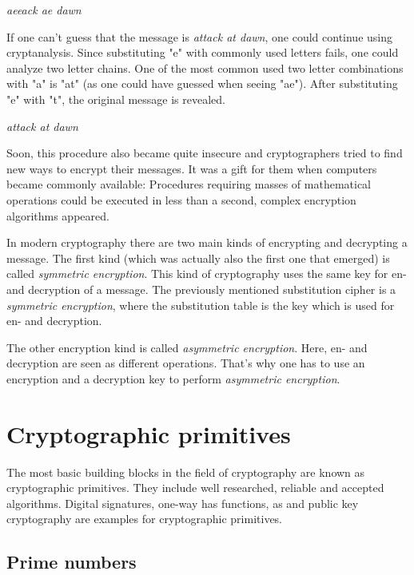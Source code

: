 \vspace{0.5cm}
\textit{aeeack ae dawn}
\vspace{0.5cm}

If one can't guess that the message is \textit{attack at dawn}, one could
continue using cryptanalysis. Since substituting "e" with commonly used letters
fails, one could analyze two letter chains. One of the most common used two
letter combinations with "a" is "at" (as one could have guessed when seeing
"ae").  After substituting "e" with "t", the original message is revealed.

\vspace{0.5cm}
\textit{attack at dawn}
\vspace{0.5cm}

Soon, this procedure also became quite insecure and cryptographers tried to
find new ways to encrypt their messages. It was a gift for them when computers
became commonly available: Procedures requiring masses of mathematical
operations could be executed in less than a second, complex encryption
algorithms appeared.

In modern cryptography there are two main kinds of encrypting and decrypting a
message. The first kind (which was actually also the first one that emerged) is
called \textit{symmetric encryption}. This kind of cryptography uses the same
key for en- and decryption of a message. The previously mentioned substitution
cipher is a \textit{symmetric encryption}, where the substitution table is the
key which is used for en- and decryption.

The other encryption kind is called \textit{asymmetric encryption}. Here, en-
and decryption are seen as different operations. That's why one has to use an
encryption and a decryption key to perform \textit{asymmetric encryption}.

\section{Cryptographic primitives}

The most basic building blocks in the field of cryptography are known as
cryptographic primitives. They include well researched, reliable and accepted
algorithms. Digital signatures, one-way has functions, as and public key
cryptography are examples for cryptographic primitives.

\subsection{Prime numbers}

